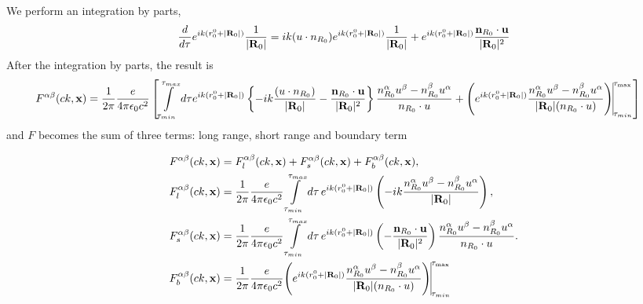 We perform an integration by parts,
\begin{align}
  \frac{d}{d\tau}e^{i k (r_0^0+|{\bf R}_0|)}\frac1{|{\bf R}_0|} = i k (u\cdot n_{R_0}) e^{i k (r_0^0+|{\bf R}_0|)}\frac1{|{\bf R}_0|} + e^{i k (r_0^0+|{\bf R}_0|)}\frac{{\bf n}_{R_0}\cdot {\bf u}}{|{\bf R}_0|^2}
\end{align}
After the integration by parts, the result is
\begin{align}
  F^{\alpha\beta}(c k, {\bf x}) & = \frac1{2\pi}\frac{e}{4\pi\epsilon_0c^2}\left[\int\limits_{\tau_{min}}^{\tau_{max}} d\tau e^{i k (r_0^0+|{\bf R}_0|)}\left\{ -ik \frac{  (u\cdot n_{R_0})}{|{\bf R}_0|}-\frac{{\bf n}_{R_0}\cdot{\bf u}}{|{\bf R}_0|^2}\right\} \frac{n_{R_0}^{\alpha}u^{\beta}-n_{R_0}^{\beta}u^{\alpha}}{n_{R_0}\cdot u}+{\left(e^{i k (r_0^0+|{\bf R}_0|)}  \frac{n_{R_0}^{\alpha}u^{\beta}-n_{R_0}^{\beta}u^{\alpha}}{{|{\bf R}_0|}(n_{R_0}\cdot u) }\right)\vline}_{\tau_{min}}^{\tau_{\max}}\right]
\end{align}
and $F$ becomes the sum of three terms: long range, short range and boundary term
\begin{highlightbox}[title={Finite-interval Fourier transform for numerical evaluation}]
  \begin{align}
    F^{\alpha\beta}(c k,{\bf x})     & = F^{\alpha\beta}_{l}(c k,{\bf x}) + F^{\alpha\beta}_{s}(c k,{\bf x}) + F^{\alpha\beta}_{b}(c k,{\bf x}),
    \\
    F^{\alpha\beta}_{l}(c k,{\bf x}) & =    \frac1{2\pi}\frac{e}{4\pi\epsilon_0c^2}\int\limits_{\tau_{min}}^{\tau_{max}} d\tau\,
    e^{i k (r_0^0+|{\bf R}_0|)}
    \left(
      -ik \frac{n_{R_0}^{\alpha}u^{\beta}-n_{R_0}^{\beta}u^{\alpha}}
    {|{\bf R}_0|}\right),
    \\
    F^{\alpha\beta}_{s}(c k,{\bf x}) & =
    \frac1{2\pi}\frac{e}{4\pi\epsilon_0c^2}\int\limits_{\tau_{min}}^{\tau_{max}} d\tau\,
    e^{i k (r_0^0+|{\bf R}_0|)}
    \left(
      - \frac{{\bf n}_{R_0}\cdot{\bf u}}{|{\bf R}_0|^2}
    \right)
    \frac{n_{R_0}^{\alpha}u^{\beta}-n_{R_0}^{\beta}u^{\alpha}}{n_{R_0}\cdot u}.\\
    F^{\alpha\beta}_{b}(ck,{\bf x}) &= \frac1{2\pi}\frac{e}{4\pi\epsilon_0c^2}
    {\left(e^{i k (r_0^0+|{\bf R}_0|)}  \frac{n_{R_0}^{\alpha}u^{\beta}-n_{R_0}^{\beta}u^{\alpha}}{{|{\bf R}_0|}(n_{R_0}\cdot u) }\right)\vline}_{\tau_{min}}^{\tau_{\max}}
  \end{align}
\end{highlightbox}

